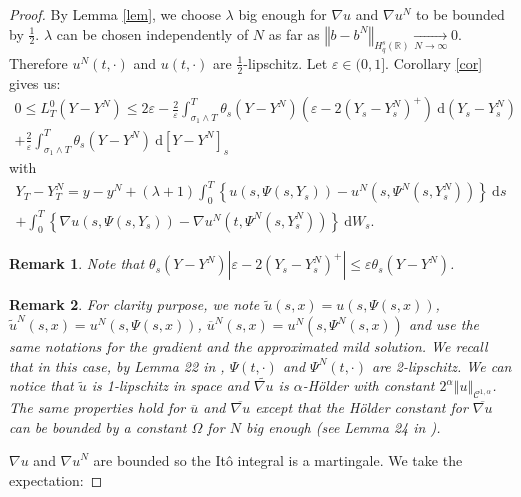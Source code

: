 \documentclass[11pt]{enstaPRE}
\newtheorem{rem}{Remark}
\newcommand{\norme}[1]{\left\Vert #1\right\Vert}
\newcommand{\R}{\mathbb{R}}
\newcommand{\di}{\mathrm{d}}
\begin{document}
\begin{proof}
    By Lemma \ref{lem}, we choose $\lambda$ big enough for $\nabla u$ and $\nabla u^N$ to be bounded by $\frac{1}{2}$. $\lambda$ can be chosen independently of $N$ as far as $\norme{b - b^N}_{H_q^s(\R)} \underset{N\rightarrow\infty}{\longrightarrow} 0$. Therefore $u^N(t,\cdot)$ and $u(t,\cdot)$ are $\frac{1}{2}$-lipschitz. 
    Let $\varepsilon\in(0,1]$. Corollary \ref{cor} gives us:    
    \begin{multline*}
    0\leq L^0_T(Y-Y^N) \leq 2\varepsilon - \frac{2}{\varepsilon}\int_{\sigma_1\wedge T}^T \theta_s(Y-Y^N) \left(\varepsilon - 2{(Y_s-Y_s^N)^+}\right)\ \di \left(Y_s-Y_s^N\right)\\
    +\frac{2}{\varepsilon}\int_{\sigma_1\wedge T}^T \theta_s(Y-Y^N) \ \di\left[Y-Y^N\right]_s
    \end{multline*}    
    with
    \begin{multline*}    
    Y_T-Y_T^N = y-y^N + (\lambda + 1 )\int_0^T\left\{u\left(s,\Psi\left(s,Y_s\right)\right)-u^N\left(s,\Psi^N\left(s,Y_s^N\right)\right)\right\}\ \di s\\ + \int_0^T\left\{\nabla u\left(s,\Psi\left(s,Y_s\right)\right)-\nabla u^N\left(t,\Psi^N\left(s,Y_s^N\right)\right)\right\}\ \di W_s.
    \end{multline*}    
    \begin{rem}
        Note that $\theta_s(Y-Y^N) \left|\varepsilon - 2{(Y_s-Y_s^N)^+}\right|\leq \varepsilon\theta_s(Y-Y^N)$.
    \end{rem}    
    \begin{rem}  
        For clarity purpose, we note $\tilde{u}\left(s,x\right) = u\left(s,\Psi\left(s,x\right)\right)$, $\tilde{u}^N\left(s,x\right) = u^N\left(s,\Psi\left(s,x\right)\right)$, $\overline{u}^N\left(s,x\right) = u^N\left(s,\Psi^N\left(s,x\right)\right)$ and use the same notations for the gradient and the approximated mild solution. We recall that in this case, by Lemma 22 in \cite{Fla-Iss-Rus-2017}, $\Psi(t,\cdot)$ and $\Psi^N(t,\cdot)$ are 2-lipschitz. We can notice that $\tilde{u}$ is 1-lipschitz in space and $\widetilde{\nabla u}$ is $\alpha$-Hölder with constant $2^\alpha\norme{u}_{\mathcal{C}^{1,\alpha}}$. The same properties hold for $\overline{u}$ and $\overline{\nabla u}$ except that the Hölder constant for $\overline{\nabla u}$ can be bounded by a constant $\Omega$ for $N$ big enough (see Lemma 24 in \cite{Fla-Iss-Rus-2017}).
    \end{rem}
    ${\nabla u}$ and ${\nabla u}^N$ are bounded so the Itô integral is a martingale. We take the expectation:

\end{proof}
\end{document}
